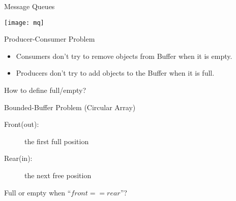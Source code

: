 \begin{frame}{Message Queues}
  \begin{center}
    \begin{minipage}{.3\linewidth}
      \texttt{[image: mq]}
    \end{minipage}\qquad
    \begin{minipage}{.3\linewidth}
    \end{minipage}
  \end{center}
\end{frame}

\begin{frame}{Producer-Consumer Problem}
  \begin{itemize}
  \item Consumers don't try to remove objects from Buffer when it is empty.
  \item Producers don't try to add objects to the Buffer when it is full.
  \end{itemize}
  \begin{center}
  \end{center}
  \begin{center}
    How to define \alert{full/empty}?
  \end{center}
\end{frame}

\begin{frame}{Bounded-Buffer Problem (Circular Array)}
  \begin{minipage}{.65\linewidth}
  \begin{description}
  \item[Front(out):] the first full position
  \item[Rear(in):] the next free position
  \end{description}
  \end{minipage}\quad
  \begin{minipage}{.3\linewidth}
  \end{minipage}
  Full or empty when ``$front == rear$''?
\end{frame}

